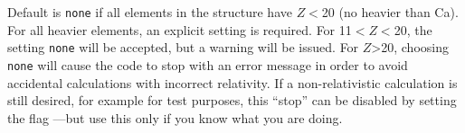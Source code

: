 Default is \texttt{none} if all elements in the structure have $Z<$20
(no heavier than Ca). For all heavier elements, an explicit
 setting is required. For 11$<Z<$20, the setting
\texttt{none} will be accepted, but a
warning will be issued. For $Z$>20, choosing \texttt{none} will cause
the code to stop with an error message in order to avoid accidental
calculations with incorrect relativity. If a non-relativistic
calculation is still desired, for example for test purposes, this
``stop'' can be disabled by setting the flag
---but use this only if you know what
you are doing.

